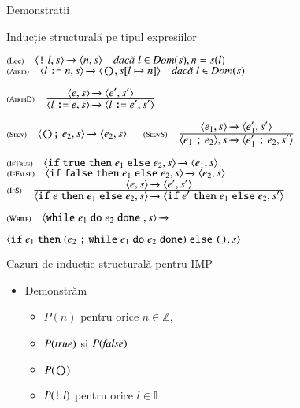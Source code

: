 \documentclass[xcolor=pdftex,romanian,colorlinks]{beamer}
\begin{document}
\begin{section}{Demonstrații}
\begin{subsection}{Inducție structurală pe tipul expresiilor}
\begin{frame}
\vfill $\reg[Loc]{\Ss{\c{\terminal{!} l,\stare}}{\c{n, \stare}}}{}{l\in\Dom(\stare), n = \stare(l)}$
$\reg[Atrib]{\Ss{\c{l \terminal{:=} n,\stare}}{\c{\Sskip,\stare[l \mapsto n]}}}{}{l\in\Dom(\stare)}$

\vfill$\reg[AtribD]{\Ss{\c{l \terminal{:=} e ,\stare}}{\c{l \terminal{:=} e' ,\stare'}}}{\Ss{\c{e,\stare}}{\c{e',\stare'}}}{}$

$\reg[Secv]{\Ss{\c{\Sskip \terminal{;} e_2,\stare}}{\c{e_2,\stare}}}{}{}$
$\reg[SecvS]{\Ss{\c{e_1 \terminal{;} e_2},\stare}{\c{e_1' \terminal{;} e_2,\stare'}}}{\Ss{\c{e_1,\stare}}{\c{e_1',\stare'}}}{}$


\vfill $\reg[IfTrue]{\Ss{\c{\Sif  {\terminal{true}} \Sthen e_1 \Selse e_2,\stare}}{\c{e_1,\stare}}}{}{}$ 
$\reg[IfFalse]{\Ss{\c{\Sif {\terminal{false}} \Sthen e_1 \Selse e_2,\stare}}{\c{e_2,\stare}}}{}{}$ 
$\reg[IfS]{
 \Ss{\c{\Sif {e} \Sthen e_1 \Selse e_2,\stare}}{\c{\Sif  {e'} \Sthen e_1 \Selse e_2,\stare'}}
}{
  \Ss{\c{e,\stare}}{\c{e',\stare'}}
}
{}$

\vfill $\reg[While]{\Ss{\c{\Swhile {e_1} \Sdo e_2 \Sdone{},\stare}}{}}{}
{}$

\hfill ${\langle{\ensuremath\mathrel{\text{\ttfamily if}}{e_1} \ensuremath\mathrel{\text{\ttfamily then}}(e_2\ensuremath\mathrel{\text{\ttfamily ;}} {\ensuremath\mathrel{\text{\ttfamily while}}{e_1} \ensuremath\mathrel{\text{\ttfamily do}}e_2 \ensuremath\mathrel{\text{\ttfamily done}}}) \ensuremath\mathrel{\text{\ttfamily else}}{\ensuremath\mathrel{\text{\ttfamily ()}}},s}\rangle}$

\end{frame}


\begin{frame}{Cazuri de inducție structurală pentru IMP}{}
\begin{itemize}
\item[]  
Demonstrăm
\begin{itemize}
\item $P(n)$ pentru orice $n \in \mathbb{Z}$,
\item $P({\it true})$ și $P({\it false})$
\item $P(\mathrel{\text{\ttfamily ()}})$
\item$P(\mathrel{\text{\ttfamily !}} l)$ pentru orice $l\in \mathbb{L}$
\end{itemize}


\end{itemize}
\end{frame}
\end{subsection}
\end{section}
\end{document}
